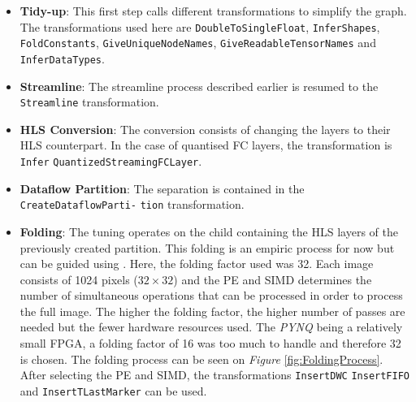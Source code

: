 \begin{itemize}
  \item \textbf{Tidy-up}: This first step calls different transformations to simplify the graph. The transformations used here are \texttt{DoubleToSingleFloat}, \texttt{InferShapes}, \texttt{FoldConstants}, \texttt{GiveUniqueNodeNames}, \texttt{GiveReadableTensorNames} and \texttt{InferDataTypes}.
  \item \textbf{Streamline}: The streamline process described earlier is resumed to the \texttt{Streamline} transformation.
  \item \textbf{HLS Conversion}: The conversion consists of changing the layers to their HLS counterpart. In the case of quantised FC layers, the transformation is \texttt{Infer} \texttt{QuantizedStreamingFCLayer}.
  \item \textbf{Dataflow Partition}: The separation is contained in the \texttt{CreateDataflowParti-} \texttt{tion} transformation.
  \item \textbf{Folding}: The tuning operates on the child containing the HLS layers of the previously created partition. This folding is an empiric process for now but can be guided using . Here, the folding factor used was 32. Each image consists of 1024 pixels ($32 \times 32$) and the PE and SIMD determines the number of simultaneous operations that can be processed in order to process the full image. The higher the folding factor, the higher number of passes are needed but the fewer hardware resources used. The \emph{PYNQ} being a relatively small FPGA, a folding factor of 16 was too much to handle and therefore 32 is chosen. The folding process can be seen on \emph{Figure} \ref{fig:FoldingProcess}. After selecting the PE and SIMD, the transformations \texttt{InsertDWC} \texttt{InsertFIFO} and \texttt{InsertTLastMarker} can be used.


\end{itemize}
